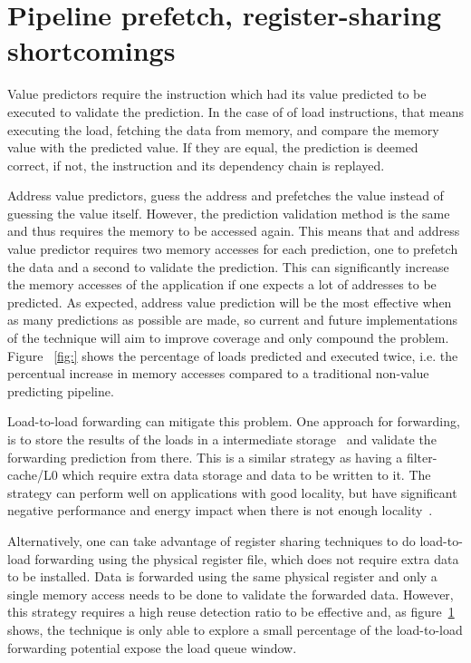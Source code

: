 \documentclass{sig-alternate}
\begin{document}
\section{Pipeline prefetch, register-sharing shortcomings}
Value predictors require the instruction which had its value predicted to be executed to validate the prediction. In the case of of load instructions, that means executing the load, fetching the data from memory, and compare the memory value with the predicted value. If they are equal, the prediction is deemed correct, if not, the instruction and its dependency chain is replayed. 

Address value predictors, guess the address and prefetches the value instead of guessing the value itself. However, the prediction validation method is the same and thus requires the memory to be accessed again. This means that and address value predictor requires two memory accesses for each prediction, one to prefetch the data and a second to validate the prediction. This can significantly increase the memory accesses of the application if one expects a lot of addresses to be predicted. As expected, address value prediction will be the most effective when as many predictions as possible are made, so current and future implementations of the technique will aim to improve coverage and only compound the problem. Figure ~\ref{fig:} shows the percentage of loads predicted and executed twice, i.e. the percentual increase in memory accesses compared to a traditional non-value predicting pipeline.

Load-to-load forwarding can mitigate this problem. One approach for forwarding, is to store the results of the loads in a intermediate storage~\cite{} and validate the forwarding prediction from there. This is a similar strategy as having a filter-cache/L0 which require extra data storage and data to be written to it. The strategy can perform well on applications with good locality, but have significant negative performance and energy impact when there is not enough locality~\cite{}.  

Alternatively, one can take advantage of register sharing techniques to do load-to-load forwarding using the physical register file, which does not require extra data to be installed. Data is forwarded using the same physical register and only a single memory access needs to be done to validate the forwarded data. However, this strategy requires a high reuse detection ratio to be effective and, as figure~\ref{} shows, the technique is only able to explore a small percentage of the load-to-load forwarding potential expose the load queue window.
\end{document}
